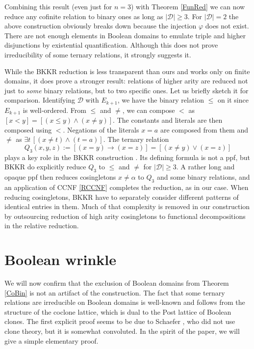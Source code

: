 \documentclass[11pt]{article}
\theoremstyle{plain}
\theoremstyle{definition}
\def\D{\mathcal{D}}
\def\a{\alpha}
\def\pfi{\varphi}
\begin{document}
Combining this result (even just for $n=3$) with Theorem \ref{FunRed} we can now reduce any cofinite relation to binary ones as long as $|\D|\geq3$. For $|\D|=2$ the above construction obviously breaks down because the injection $\pfi$ does not exist. There are not enough elements in Boolean domains to emulate triple and higher disjunctions by existential quantification. Although this does not prove irreducibility of some ternary relations, it strongly suggests it. 

While the BKKR reduction \cite{BKKR} is less transparent than ours and works only on finite domains, it does prove a stronger result: relations of higher arity are reduced not just to {\it some} binary relations, but to two specific ones. Let us briefly sketch it for comparison. Identifying $\D$ with $E_{k+1}$, we have the binary relation $\leq$ on it since $E_{k+1}$ is well-ordered. From $\leq$ and $\neq$, we can compose $<$ as $[x<y]=[(x\leq y)\land(x\neq y)]$. The constants and literals are then composed using $<$. Negations of the literals $x=a$ are composed from them and $\neq$ as $\exists t\,[(x\neq t)\land (t=a)]$.
The ternary relation 
$$
Q_3(x,y,z):=[(x=y)\to(x=z)]=[(x\neq y)\lor(x=z)]
$$ 
plays a key role in the BKKR construction \cite{BKKR}. Its defining formula is not a ppf, but BKKR do explicitly reduce $Q_3$ to $\leq$ and $\neq$ for $|\D|\geq3$. A rather long and opaque ppf then reduces cosingletons $x\neq\a$ to $Q_3$ and some binary relations, and an application of CCNF \eqref{RCCNF} completes the reduction, as in our case. When reducing cosingletons, BKKR have to separately consider different patterns of identical entries in them. Much of that complexity is removed in our construction by outsourcing reduction of high arity cosingletons to functional decompositions in the relative reduction.





\section{Boolean wrinkle}\label{BoolIrr}

We will now confirm that the exclusion of Boolean domains from Theorem \ref{CoBin} is not an artifact of the construction. The fact that some ternary relations are irreducible on Boolean domains is well-known and follows from the structure of the coclone lattice, which is dual to the Post lattice of Boolean clones. The first explicit proof seems to be due to Schaefer \cite{Sch78}, who did not use clone theory, but it is  somewhat convoluted. In the spirit of the paper, we will give a simple elementary proof.
\end{document}
